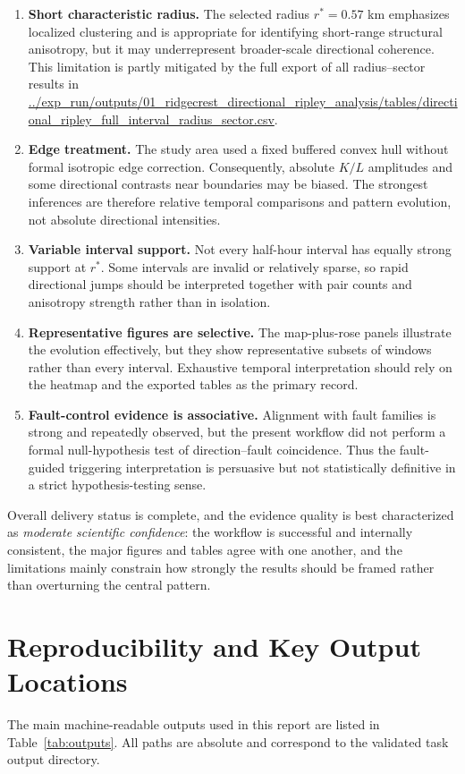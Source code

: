 \documentclass[11pt]{article}
\begin{document}
\begin{enumerate}[leftmargin=2em]
    \item \textbf{Short characteristic radius.} The selected radius $r^{\ast}=0.57$ km emphasizes localized clustering and is appropriate for identifying short-range structural anisotropy, but it may underrepresent broader-scale directional coherence. This limitation is partly mitigated by the full export of all radius--sector results in \url{../exp_run/outputs/01_ridgecrest_directional_ripley_analysis/tables/directional_ripley_full_interval_radius_sector.csv}.
    \item \textbf{Edge treatment.} The study area used a fixed buffered convex hull without formal isotropic edge correction. Consequently, absolute $K/L$ amplitudes and some directional contrasts near boundaries may be biased. The strongest inferences are therefore relative temporal comparisons and pattern evolution, not absolute directional intensities.
    \item \textbf{Variable interval support.} Not every half-hour interval has equally strong support at $r^{\ast}$. Some intervals are invalid or relatively sparse, so rapid directional jumps should be interpreted together with pair counts and anisotropy strength rather than in isolation.
    \item \textbf{Representative figures are selective.} The map-plus-rose panels illustrate the evolution effectively, but they show representative subsets of windows rather than every interval. Exhaustive temporal interpretation should rely on the heatmap and the exported tables as the primary record.
    \item \textbf{Fault-control evidence is associative.} Alignment with fault families is strong and repeatedly observed, but the present workflow did not perform a formal null-hypothesis test of direction--fault coincidence. Thus the fault-guided triggering interpretation is persuasive but not statistically definitive in a strict hypothesis-testing sense.
\end{enumerate}

Overall delivery status is complete, and the evidence quality is best characterized as \emph{moderate scientific confidence}: the workflow is successful and internally consistent, the major figures and tables agree with one another, and the limitations mainly constrain how strongly the results should be framed rather than overturning the central pattern.

\section{Reproducibility and Key Output Locations}
The main machine-readable outputs used in this report are listed in Table~\ref{tab:outputs}. All paths are absolute and correspond to the validated task output directory.
\end{document}
